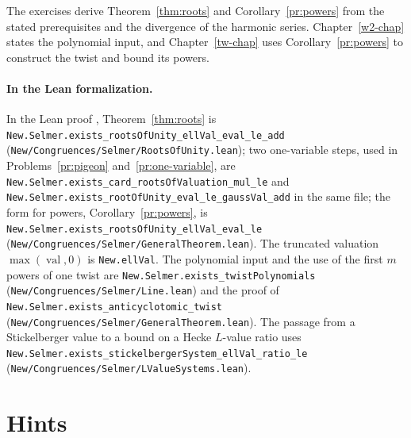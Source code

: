 \documentclass[reqno]{amsart}
\newcounter{chap}
\theoremstyle{definition}
\theoremstyle{plain}
\newcommand{\val}{\operatorname{val}}
\begin{document}
\medskip
The exercises derive Theorem~\ref{thm:roots} and Corollary~\ref{pr:powers} from the stated prerequisites and the divergence of the harmonic series.  Chapter~\ref{w2-chap} states the polynomial input, and Chapter~\ref{tw-chap} uses Corollary~\ref{pr:powers} to construct the twist and bound its powers.

\paragraph{In the Lean formalization.}
In the Lean proof \cite{GL}, Theorem~\ref{thm:roots} is \texttt{New.Selmer.exists\_rootsOfUnity\_ellVal\_eval\_le\_add} (\nolinkurl{New/Congruences/Selmer/RootsOfUnity.lean}); two one-variable steps, used in Problems~\ref{pr:pigeon} and~\ref{pr:one-variable}, are \texttt{New.Selmer.exists\_card\_rootsOfValuation\_mul\_le} and \texttt{New.Selmer.exists\_rootOfUnity\_eval\_le\_gaussVal\_add} in the same file; the form for powers, Corollary~\ref{pr:powers}, is \texttt{New.Selmer.exists\_rootsOfUnity\_ellVal\_eval\_le} (\nolinkurl{New/Congruences/Selmer/GeneralTheorem.lean}).  The truncated valuation \(\max(\val, 0)\) is \nolinkurl{New.ellVal}.  The polynomial input and the use of the first \(m\) powers of one twist are \nolinkurl{New.Selmer.exists_twistPolynomials} (\nolinkurl{New/Congruences/Selmer/Line.lean}) and the proof of \nolinkurl{New.Selmer.exists_anticyclotomic_twist} (\nolinkurl{New/Congruences/Selmer/GeneralTheorem.lean}).  The passage from a Stickelberger value to a bound on a Hecke \(L\)-value ratio uses \nolinkurl{New.Selmer.exists_stickelbergerSystem_ellVal_ratio_le} (\nolinkurl{New/Congruences/Selmer/LValueSystems.lean}).

\section*{Hints}
\end{document}
